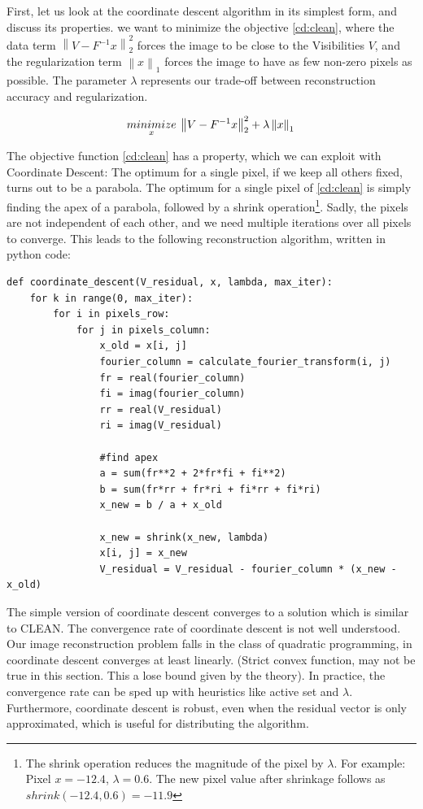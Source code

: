 First, let us look at the coordinate descent algorithm in its simplest form, and discuss its properties. we want to minimize the objective \eqref{cd:clean}, where the data term $\left \| V - F^{-1}x \right \|_2^2$ forces the image to be close to the Visibilities $V$, and the regularization term $\left \| x \right \|_1$ forces the image to have as few non-zero pixels as possible. The parameter $\lambda$ represents our trade-off between reconstruction accuracy and regularization. 
 
\begin{equation}\label{cd:clean}
	\underset{x}{minimize} \: \left \| V - F^{-1}x \right \|_2^2 + \lambda \left \| x \right \|_1 \\
\end{equation}

The objective function \eqref{cd:clean} has a property, which we can exploit with Coordinate Descent: The optimum for a single pixel, if we keep all others fixed, turns out to be a parabola. The optimum for a single pixel of \eqref{cd:clean} is simply finding the apex of a parabola, followed by a shrink operation\footnote{The shrink operation reduces the magnitude of the pixel by $\lambda$. For example: Pixel $x = -12.4$, $\lambda = 0.6$. The new pixel value after shrinkage follows as $shrink(-12.4, 0.6) = -11.9$}. Sadly, the pixels are not independent of each other, and we need multiple iterations over all pixels to converge. This leads to the following reconstruction algorithm, written in python code:

\begin{lstlisting} 
def coordinate_descent(V_residual, x, lambda, max_iter):
	for k in range(0, max_iter):
		for i in pixels_row:
			for j in pixels_column:
				x_old = x[i, j]
				fourier_column = calculate_fourier_transform(i, j)
				fr = real(fourier_column)
				fi = imag(fourier_column)
				rr = real(V_residual)
				ri = imag(V_residual)
				
				#find apex
				a = sum(fr**2 + 2*fr*fi + fi**2)
				b = sum(fr*rr + fr*ri + fi*rr + fi*ri)
				x_new = b / a + x_old
				
				x_new = shrink(x_new, lambda)
				x[i, j] = x_new
				V_residual = V_residual - fourier_column * (x_new - x_old)
\end{lstlisting}\label{cd:basic}

The simple version of coordinate descent converges to a solution which is similar to CLEAN. The convergence rate of coordinate descent is not well understood. Our image reconstruction problem falls in the class of quadratic programming, in coordinate descent converges at least linearly\cite{luo1992convergence}. (Strict convex function, may not be true in this section. This a lose bound given by the theory). In practice, the convergence rate can be sped up with heuristics like active set\cite{activeset} and $\lambda$\cite{lambda}. Furthermore, coordinate descent is robust, even when the residual vector is only approximated, which is useful for distributing the algorithm.

